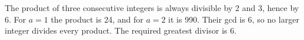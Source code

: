 The product of three consecutive integers is always divisible by 2 and 3, hence by 6. For $a=1$ the product is 24, and for $a=2$ it is 990. Their gcd is 6, so no larger integer divides every product. The required greatest divisor is $\boxed6$.
